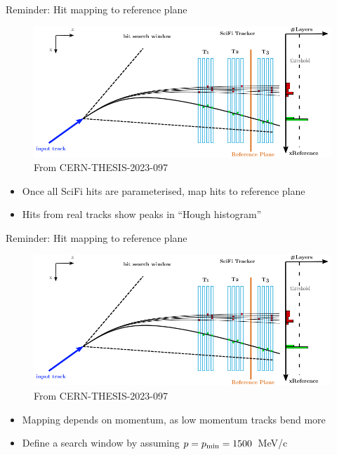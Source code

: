 \documentclass[xcolor={dvipsnames}]{beamer}
\begin{document}
\begin{frame}{Reminder: Hit mapping to reference plane}
  \vspace{0.0cm}
  \begin{figure}[htb]
    \centering
    \includegraphics[width=1\textwidth]{Plots/HoughTransform.png}
  \caption*{\small From CERN-THESIS-2023-097}
  \end{figure}
  \vspace{-0.3cm}
  \begin{itemize}
    \item{Once all SciFi hits are parameterised, map hits to reference plane}
    \item{Hits from real tracks show peaks in ``Hough histogram''}
  \end{itemize}
\end{frame}

\begin{frame}{Reminder: Hit mapping to reference plane}
  \vspace{0.0cm}
  \begin{figure}[htb]
    \centering
    \includegraphics[width=1\textwidth]{Plots/HoughTransform.png}
  \caption*{\small From CERN-THESIS-2023-097}
  \end{figure}
  \vspace{-0.3cm}
  \begin{itemize}
    \item{Mapping depends on momentum, as low momentum tracks bend more}
    \item{Define a search window by assuming $p = p_{\rm min} = 1500$~MeV/c}
  \end{itemize}
\end{frame}
\end{document}
